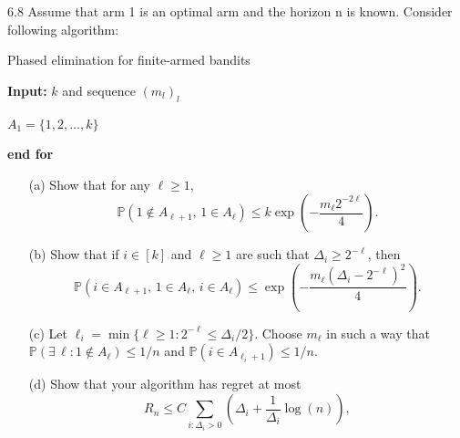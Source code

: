 \documentclass[10pt]{article}
\theoremstyle{definition}
\newenvironment{exercise*}[1]{%
  \IfBlankTF{#1}
    {\renewcommand{\themanualexerciseinner}{\unskip}}
    {\renewcommand\themanualexerciseinner{#1}}%
  \manualexerciseinner
}{\endmanualexerciseinner}
\begin{document}
\begin{exercise*}{6.8}
    Assume that arm 1 is an optimal arm and the horizon n is known. Consider following algorithm:

    \begin{algorithm*}[H]
        \caption{Phased elimination for finite-armed bandits}
        \textbf{Input: } $k$ and sequence $(m_l)_l$

        $A_1 = \{1, 2, \ldots, k\}$

        \textbf{end for}
    \end{algorithm*}
    \begin{itemize}
        \item[(a)] Show that for any $\ell \geq 1$,
        \begin{equation*}
            \mathbb{P}(1 \notin A_{\ell+1},\, 1 \in A_\ell)
            \leq k \exp\left(-\frac{m_\ell 2^{-2\ell}}{4}\right).
        \end{equation*}
        \item[(b)] Show that if $i \in [k]$ and $\ell \geq 1$ are such that
        $\Delta_i \geq 2^{-\ell}$, then
        \begin{equation*}
            \mathbb{P}(i \in A_{\ell+1},\, 1 \in A_\ell,\, i \in A_\ell)
            \leq \exp\left(
                -\frac{m_\ell(\Delta_i - 2^{-\ell})^2}{4}
            \right).
        \end{equation*}
        \item[(c)] Let $\ell_i = \min\{\ell \geq 1 : 2^{-\ell} \leq \Delta_i/2\}$.
        Choose $m_\ell$ in such a way that
        $\mathbb{P}(\exists\, \ell : 1 \notin A_\ell) \leq 1/n$ and $\mathbb{P}(i \in A_{\ell_i+1}) \leq 1/n$.
        \item[(d)] Show that your algorithm has regret at most
        \begin{equation*}
            R_n \leq C \sum_{i:\Delta_i>0}
            \left(
                \Delta_i + \frac{1}{\Delta_i}\log(n)
            \right),
        \end{equation*}

\end{itemize}
\end{exercise*}
\end{document}
